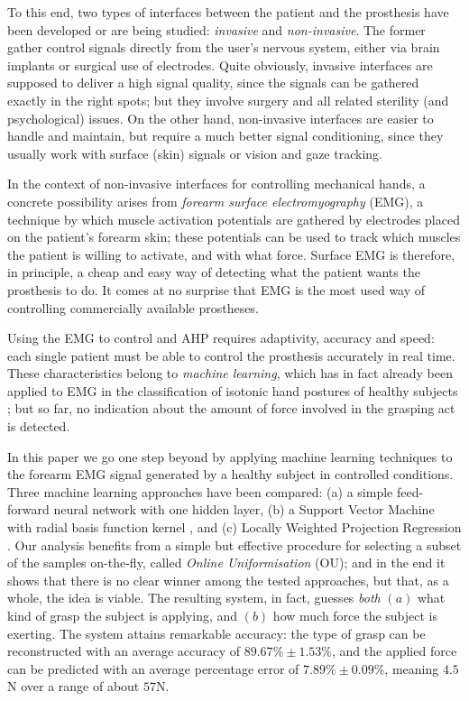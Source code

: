 To this end, two types of interfaces between the patient and the
prosthesis have been developed or are being studied: \emph{invasive}
and \emph{non-invasive}. The former gather control signals directly
from the user's nervous system, either via brain implants or surgical
use of electrodes. Quite obviously, invasive interfaces are supposed
to deliver a high signal quality, since the signals can be gathered
exactly in the right spots; but they involve surgery and all related
sterility (and psychological) issues. On the other hand, non-invasive
interfaces are easier to handle and maintain, but require a much
better signal conditioning, since they usually work with surface
(skin) signals or vision and gaze tracking.

In the context of non-invasive interfaces for controlling mechanical
hands, a concrete possibility arises from \emph{forearm surface
electromyography} (EMG), a technique by which muscle
activation potentials are gathered by electrodes placed on the
patient's forearm skin; these potentials can be used to track which
muscles the patient is willing to activate, and with what force.
Surface EMG is therefore, in principle, a cheap and easy way of
detecting what the patient wants the prosthesis to do. It comes at no
surprise that EMG is the most used way of controlling commercially
available prostheses.

Using the EMG to control and AHP requires adaptivity, accuracy and
speed: each single patient must be able to control the prosthesis
accurately in real time. These characteristics belong to \emph{machine
learning}, which has in fact already been applied to EMG in the
classification of isotonic hand postures of healthy subjects
\cite{ekvall,smagt}; but so far, no indication about the amount of
force involved in the grasping act is detected.

In this paper we go one step beyond by applying machine learning
techniques to the forearm EMG signal generated by a healthy subject in
controlled conditions. Three machine learning approaches have been compared: 
(a) a simple feed-forward neural network with one hidden layer,
(b) a Support Vector Machine with radial basis function kernel
\cite{BGV92}, and (c) Locally Weighted Projection Regression
\cite{lwpr}. Our analysis benefits from a simple but effective procedure
for selecting a subset of the samples on-the-fly, called \emph{Online
Uniformisation} (OU); and in the end it shows that there is no clear
winner among the tested approaches, but that, as a whole, the idea is
viable. The resulting system, in fact, guesses \emph{both} $(a)$ what
kind of grasp the subject is applying, and $(b)$ how much force the
subject is exerting. The system attains remarkable accuracy: the type
of grasp can be reconstructed with an average accuracy of $89.67\% \pm
1.53\%$, and the applied force can be predicted with an average
percentage error of $7.89\% \pm 0.09\%$, meaning $4.5$N over a range
of about $57$N.

